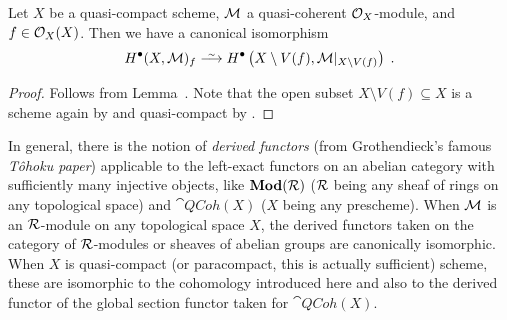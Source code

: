 \documentclass[a4paper,parskip=half,numbers=enddot, DIV=12]{scrreprt}
\begin{document}
\begin{prop}
	Let $X$ be a quasi-compact scheme, $\mathcal{M}$ a quasi-coherent $\mathcal{O}_X$-module, and $f\in\mathcal{O}_X(X)$. Then we have a canonical isomorphism
	\begin{align*}
		H^\bullet (X,\Mm)_f\isomorphism H^\bullet \left(X\setminus V(f),\Mm|_{X\setminus V(f)}\right)\;.
	\end{align*}
\end{prop}
\begin{proof}
	Follows from Lemma~. Note that the open subset $X\setminus V(f)\subseteq X$ is a scheme again by \cite[Fact~1.5.9]{alggeo1} and quasi-compact by \cite[Fact~2.1.2]{alggeo1}.
\end{proof}
\begin{rem*}
	In general, there is the notion of \emph{derived functors} (from Grothendieck's famous \emph{T\^{o}hoku paper}) applicable to the left-exact functors on an abelian category with sufficiently many injective objects, like $\cat{Mod}(\Rr)$ ($\mathcal{R}$ being any sheaf of rings on any topological space) and $\cat{QCoh}(X)$ ($X$ being any prescheme). When $\mathcal{M}$ is an $\mathcal{R}$-module on any topological space $X$, the derived functors taken on the category of $\mathcal{R}$-modules or sheaves of abelian groups are canonically isomorphic. When $X$ is quasi-compact (or paracompact, this is actually sufficient) scheme, these are isomorphic to the cohomology introduced here and also to the derived functor of the global section functor taken for $\cat{QCoh}(X)$.
\end{rem*}
\end{document}
